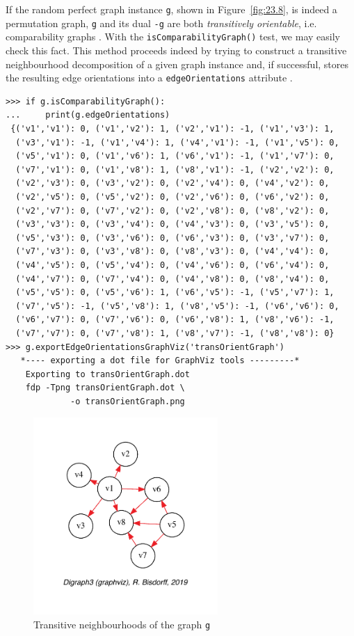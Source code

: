If the random perfect graph instance \texttt{g}, shown in Figure~\vref{fig:23.8}, is indeed a permutation graph, \texttt{g} and its dual \texttt{-g} are both \emph{transitively orientable}, i.e. comparability graphs \citep{GOL-2004}. With the \texttt{isComparabilityGraph()} test, we may easily check this fact. This method proceeds indeed by trying to construct a transitive neighbourhood decomposition of a given graph instance and, if successful, stores the resulting edge orientations into a \texttt{edgeOrientations} attribute \citep[p.129-132]{GOL-2004}.
\begin{lstlisting}[basicstyle=\scriptsize]
>>> if g.isComparabilityGraph():
...     print(g.edgeOrientations)  
 {('v1','v1'): 0, ('v1','v2'): 1, ('v2','v1'): -1, ('v1','v3'): 1,
  ('v3','v1'): -1, ('v1','v4'): 1, ('v4','v1'): -1, ('v1','v5'): 0,
  ('v5','v1'): 0, ('v1','v6'): 1, ('v6','v1'): -1, ('v1','v7'): 0,
  ('v7','v1'): 0, ('v1','v8'): 1, ('v8','v1'): -1, ('v2','v2'): 0,
  ('v2','v3'): 0, ('v3','v2'): 0, ('v2','v4'): 0, ('v4','v2'): 0,
  ('v2','v5'): 0, ('v5','v2'): 0, ('v2','v6'): 0, ('v6','v2'): 0,
  ('v2','v7'): 0, ('v7','v2'): 0, ('v2','v8'): 0, ('v8','v2'): 0,
  ('v3','v3'): 0, ('v3','v4'): 0, ('v4','v3'): 0, ('v3','v5'): 0,
  ('v5','v3'): 0, ('v3','v6'): 0, ('v6','v3'): 0, ('v3','v7'): 0,
  ('v7','v3'): 0, ('v3','v8'): 0, ('v8','v3'): 0, ('v4','v4'): 0,
  ('v4','v5'): 0, ('v5','v4'): 0, ('v4','v6'): 0, ('v6','v4'): 0,
  ('v4','v7'): 0, ('v7','v4'): 0, ('v4','v8'): 0, ('v8','v4'): 0,
  ('v5','v5'): 0, ('v5','v6'): 1, ('v6','v5'): -1, ('v5','v7'): 1,
  ('v7','v5'): -1, ('v5','v8'): 1, ('v8','v5'): -1, ('v6','v6'): 0,
  ('v6','v7'): 0, ('v7','v6'): 0, ('v6','v8'): 1, ('v8','v6'): -1,
  ('v7','v7'): 0, ('v7','v8'): 1, ('v8','v7'): -1, ('v8','v8'): 0}
>>> g.exportEdgeOrientationsGraphViz('transOrientGraph')
   *---- exporting a dot file for GraphViz tools ---------*
    Exporting to transOrientGraph.dot
    fdp -Tpng transOrientGraph.dot \
             -o transOrientGraph.png
\end{lstlisting}		    
\begin{figure}[ht]
\sidecaption[t]
\includegraphics[width=7cm]{Figures/23-9-transOrientGraph.pdf}
\caption[Transitive neighbourhoods of a graph]{Transitive neighbourhoods of the graph \texttt{g}} 
\label{fig:23.9}       %
\end{figure}

